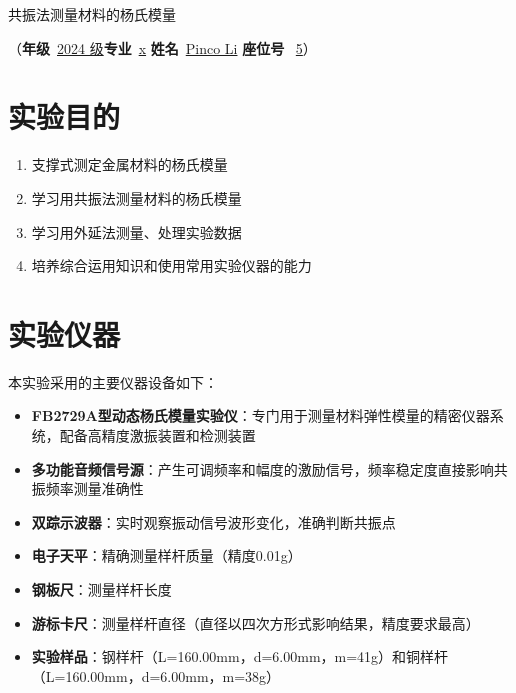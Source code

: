 ﻿\documentclass[12pt,a4paper]{article}
\begin{document}
\begin{center}
  {\heiti 共振法测量材料的杨氏模量}
\end{center}
\vspace{0.5\baselineskip}
\begin{center}
  （\textbf{年级}\ \underline{2024 级}\quad \textbf{专业}\ \underline{x} \quad \textbf{姓名}\ \underline{Pinco Li} \quad \textbf{座位号} \ \underline{5}）
\end{center}
\vspace{0.5\baselineskip}

\section{实验目的}

\begin{enumerate}
  \item 支撑式测定金属材料的杨氏模量
  \item 学习用共振法测量材料的杨氏模量
  \item 学习用外延法测量、处理实验数据
  \item 培养综合运用知识和使用常用实验仪器的能力
\end{enumerate}

\section{实验仪器}

本实验采用的主要仪器设备如下：

\begin{itemize}
    \item \textbf{FB2729A型动态杨氏模量实验仪}：专门用于测量材料弹性模量的精密仪器系统，配备高精度激振装置和检测装置
    \item \textbf{多功能音频信号源}：产生可调频率和幅度的激励信号，频率稳定度直接影响共振频率测量准确性
    \item \textbf{双踪示波器}：实时观察振动信号波形变化，准确判断共振点
    \item \textbf{电子天平}：精确测量样杆质量（精度0.01g）
    \item \textbf{钢板尺}：测量样杆长度
    \item \textbf{游标卡尺}：测量样杆直径（直径以四次方形式影响结果，精度要求最高）
    \item \textbf{实验样品}：钢样杆（L=160.00mm，d=6.00mm，m=41g）和铜样杆（L=160.00mm，d=6.00mm，m=38g）
\end{itemize}
\end{document}
